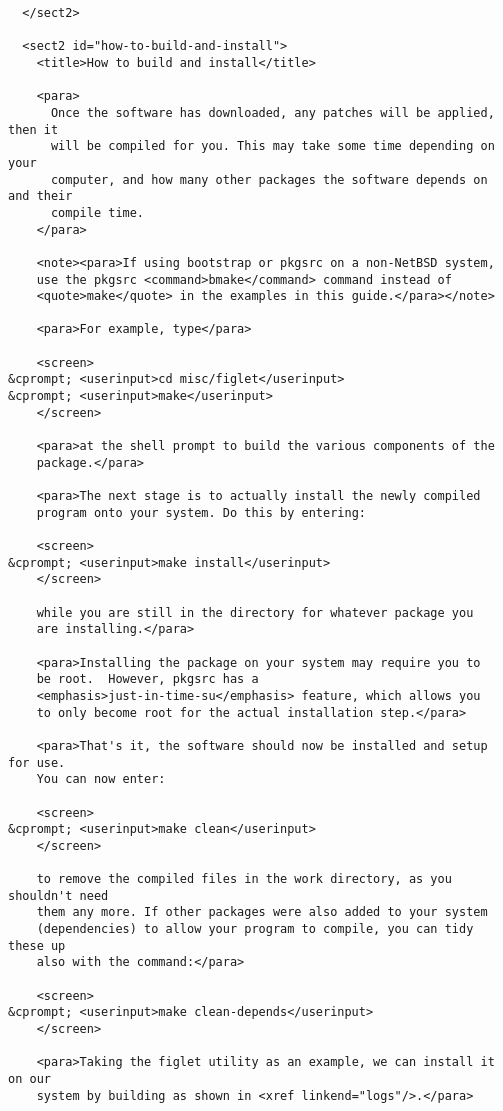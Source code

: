 \begin{verbatim}
  </sect2>

  <sect2 id="how-to-build-and-install">
    <title>How to build and install</title>

    <para>
      Once the software has downloaded, any patches will be applied, then it
      will be compiled for you. This may take some time depending on your
      computer, and how many other packages the software depends on and their
      compile time.
    </para>

    <note><para>If using bootstrap or pkgsrc on a non-NetBSD system,
    use the pkgsrc <command>bmake</command> command instead of
    <quote>make</quote> in the examples in this guide.</para></note>

    <para>For example, type</para>

    <screen>
&cprompt; <userinput>cd misc/figlet</userinput>
&cprompt; <userinput>make</userinput>
    </screen>

    <para>at the shell prompt to build the various components of the
    package.</para>

    <para>The next stage is to actually install the newly compiled
    program onto your system. Do this by entering:

    <screen>
&cprompt; <userinput>make install</userinput>
    </screen>

    while you are still in the directory for whatever package you
    are installing.</para>

    <para>Installing the package on your system may require you to
    be root.  However, pkgsrc has a
    <emphasis>just-in-time-su</emphasis> feature, which allows you
    to only become root for the actual installation step.</para>

    <para>That's it, the software should now be installed and setup for use.
    You can now enter:

    <screen>
&cprompt; <userinput>make clean</userinput>
    </screen>

    to remove the compiled files in the work directory, as you shouldn't need
    them any more. If other packages were also added to your system
    (dependencies) to allow your program to compile, you can tidy these up
    also with the command:</para>

    <screen>
&cprompt; <userinput>make clean-depends</userinput>
    </screen>

    <para>Taking the figlet utility as an example, we can install it on our
    system by building as shown in <xref linkend="logs"/>.</para>


\end{verbatim}
